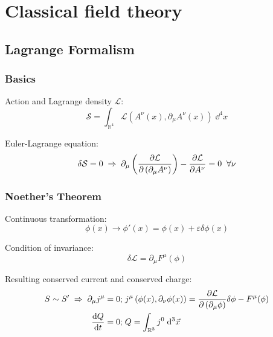 \section{Classical field theory}
	\subsection{Lagrange Formalism}
		\subsubsection{Basics}
			\noindent
			Action and Lagrange density $\mathcal{L}$:
			\begin{equation}
				\mathcal{S} = \int_{\mathbb{R}^4} \mathcal{L}(A^\nu(x),\partial_\mu A^\nu(x)) \;\dd^4 x
			\end{equation}

			\noindent
			Euler-Lagrange equation:
			\begin{equation}
				\delta\mathcal{S} = 0
				\;\Rightarrow\; \partial_\mu \left(\frac{\partial \mathcal{L}}{\partial \left(\partial_\mu A^\nu\right)}\right) - \frac{\partial \mathcal{L}}{\partial A^\nu} = 0 \;\;\forall \nu
			\end{equation}

		\subsubsection{Noether's Theorem}
			\noindent
			Continuous transformation:%
			\begin{equation}
				\phi(x)\rightarrow\phi'(x) = \phi(x) + \varepsilon \delta \phi(x)
			\end{equation}
			
			\noindent
			Condition of invariance:%
			\begin{equation}
				\delta\mathcal{L} = \partial_\mu F^\mu(\phi)
			\end{equation}

			\noindent
			Resulting conserved current and conserved charge:%
			\begin{equation}
				\begin{aligned}
					S \sim S' \;\Rightarrow\;\partial_\mu j^\mu = 0;&\; j^\mu \left( \phi(x), \partial_\nu\phi(x) \right) = \frac{\partial \mathcal{L}}{\partial \left(\partial_\mu \phi\right)}\delta\phi - F^\mu(\phi) \\
					\frac{\dd Q}{\dd t} = 0;&\; Q = \int_{\mathbb{R}^3} j^0\;\dd^3\vec{x}
				\end{aligned}
			\end{equation}
